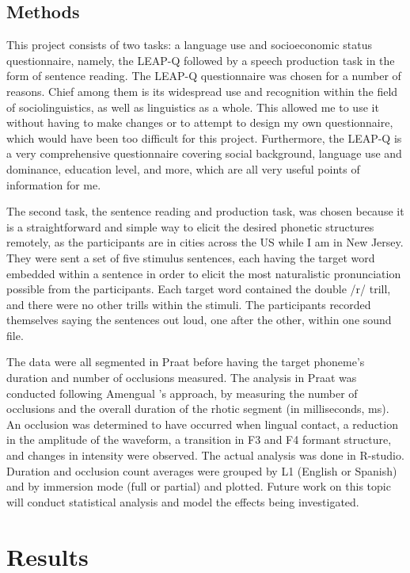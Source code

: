 \documentclass[
  a4paper,
  11pt,
  twocolumn]{article}
\begin{document}
\subsection{Methods}

This project consists of two tasks: a language use and socioeconomic
status questionnaire, namely, the LEAP-Q \cite{marian_leapq_2007}
followed by a speech production task in the form of sentence reading.
The LEAP-Q questionnaire was chosen for a number of reasons. Chief among
them is its widespread use and recognition within the field of
sociolinguistics, as well as linguistics as a whole. This allowed me to
use it without having to make changes or to attempt to design my own
questionnaire, which would have been too difficult for this project.
Furthermore, the LEAP-Q is a very comprehensive questionnaire covering
social background, language use and dominance, education level, and
more, which are all very useful points of information for me.

The second task, the sentence reading and production task, was chosen
because it is a straightforward and simple way to elicit the desired
phonetic structures remotely, as the participants are in cities across
the US while I am in New Jersey. They were sent a set of five stimulus
sentences, each having the target word embedded within a sentence in
order to elicit the most naturalistic pronunciation possible from the
participants. Each target word contained the double /r/ trill, and there
were no other trills within the stimuli. The participants recorded
themselves saying the sentences out loud, one after the other, within
one sound file.

The data were all segmented in Praat \cite{boersma_praat_2001} before
having the target phoneme's duration and number of occlusions measured.
The analysis in Praat was conducted following Amengual
\cite{amengual_acoustic_2016}'s approach, by measuring the number of
occlusions and the overall duration of the rhotic segment (in
milliseconds, ms). An occlusion was determined to have occurred when
lingual contact, a reduction in the amplitude of the waveform, a
transition in F3 and F4 formant structure, and changes in intensity were
observed. The actual analysis was done in R-studio. Duration and
occlusion count averages were grouped by L1 (English or Spanish) and by
immersion mode (full or partial) and plotted. Future work on this topic
will conduct statistical analysis and model the effects being
investigated.

\section{Results}
\end{document}
